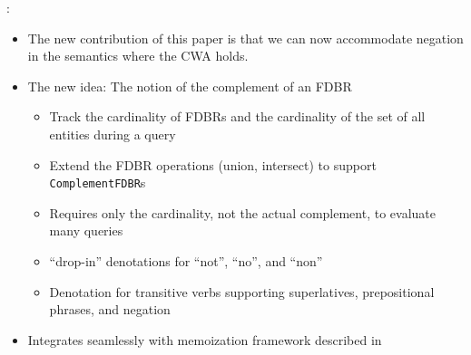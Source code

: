 \documentclass[logoontitle,tabu,supertabular,aspectratio=43]{preney-uwindsor-beamer}
\begin{document}
    \begin{frame}{\insertsection: \insertsubsection}
        \begin{itemize}
            \item The new contribution of this paper is that we can now accommodate negation in the semantics where the CWA holds.
            \item The new idea: The notion of the complement of an FDBR
            \begin{itemize}
                \item Track the cardinality of FDBRs and the cardinality of the set of all entities during a query
                \item Extend the FDBR operations (union, intersect) to support \texttt{ComplementFDBR}s
                \item Requires only the cardinality, not the actual complement, to evaluate many queries
                \item ``drop-in'' denotations for ``not'', ``no'', and ``non''
                \item Denotation for transitive verbs supporting superlatives, prepositional phrases, and negation
            \end{itemize}
            \item Integrates seamlessly with memoization framework described in \cite{peelar2020webistjournal}
        \end{itemize}
    \end{frame}

\end{document}
